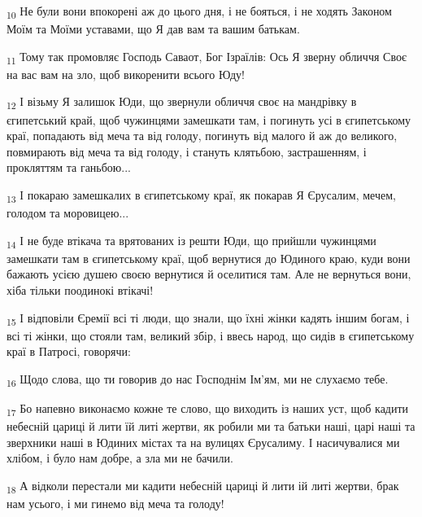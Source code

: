 \begin{tcolorbox}
\textsubscript{10} Не були вони впокорені аж до цього дня, і не бояться, і не ходять Законом Моїм та Моїми уставами, що Я дав вам та вашим батькам.
\end{tcolorbox}
\begin{tcolorbox}
\textsubscript{11} Тому так промовляє Господь Саваот, Бог Ізраїлів: Ось Я зверну обличчя Своє на вас вам на зло, щоб викоренити всього Юду!
\end{tcolorbox}
\begin{tcolorbox}
\textsubscript{12} І візьму Я залишок Юди, що звернули обличчя своє на мандрівку в єгипетський край, щоб чужинцями замешкати там, і погинуть усі в єгипетському краї, попадають від меча та від голоду, погинуть від малого й аж до великого, повмирають від меча та від голоду, і стануть клятьбою, застрашенням, і прокляттям та ганьбою...
\end{tcolorbox}
\begin{tcolorbox}
\textsubscript{13} І покараю замешкалих в єгипетському краї, як покарав Я Єрусалим, мечем, голодом та моровицею...
\end{tcolorbox}
\begin{tcolorbox}
\textsubscript{14} І не буде втікача та врятованих із решти Юди, що прийшли чужинцями замешкати там в єгипетському краї, щоб вернутися до Юдиного краю, куди вони бажають усією душею своєю вернутися й оселитися там. Але не вернуться вони, хіба тільки поодинокі втікачі!
\end{tcolorbox}
\begin{tcolorbox}
\textsubscript{15} І відповіли Єремії всі ті люди, що знали, що їхні жінки кадять іншим богам, і всі ті жінки, що стояли там, великий збір, і ввесь народ, що сидів в єгипетському краї в Патросі, говорячи:
\end{tcolorbox}
\begin{tcolorbox}
\textsubscript{16} Щодо слова, що ти говорив до нас Господнім Ім'ям, ми не слухаємо тебе.
\end{tcolorbox}
\begin{tcolorbox}
\textsubscript{17} Бо напевно виконаємо кожне те слово, що виходить із наших уст, щоб кадити небесній цариці й лити їй литі жертви, як робили ми та батьки наші, царі наші та зверхники наші в Юдиних містах та на вулицях Єрусалиму. І насичувалися ми хлібом, і було нам добре, а зла ми не бачили.
\end{tcolorbox}
\begin{tcolorbox}
\textsubscript{18} А відколи перестали ми кадити небесній цариці й лити ій литі жертви, брак нам усього, і ми гинемо від меча та голоду!
\end{tcolorbox}
